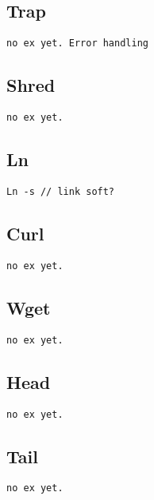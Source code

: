 \subsection{Trap}

\begin{verbatim}
no ex yet. Error handling
\end{verbatim}

\subsection{Shred}
\begin{verbatim}
no ex yet.
\end{verbatim}

\subsection{Ln}

\begin{verbatim}
Ln -s // link soft?
\end{verbatim}

\subsection{Curl}

\begin{verbatim}
no ex yet.
\end{verbatim}

\subsection{Wget}

\begin{verbatim}
no ex yet.
\end{verbatim}

\subsection{Head}

\begin{verbatim}
no ex yet.
\end{verbatim}

\subsection{Tail}

\begin{verbatim}
no ex yet.
\end{verbatim}

